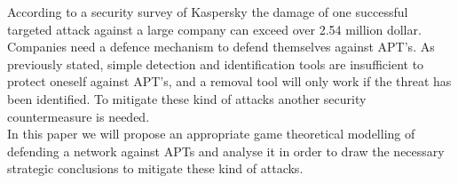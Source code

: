 
According to a security survey of Kaspersky \cite{SurveyKaspersky}  the damage of one successful targeted attack against a large company can exceed over 2.54 million dollar. Companies need a defence mechanism to defend themselves against APT's. As previously stated, simple detection and identification tools are insufficient to protect oneself against APT's, and a removal tool will only work if the threat has been identified. To mitigate these kind of attacks another security countermeasure is needed. \\
In this paper we will propose an appropriate game theoretical modelling of defending a network against APTs and analyse it in order to draw the necessary strategic conclusions to mitigate these kind of attacks.


